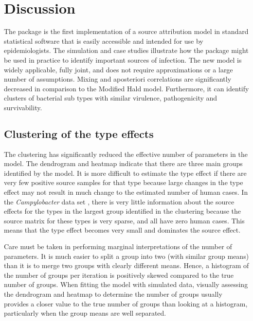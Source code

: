 \section{Discussion} \label{discussion_section}

The  package is the first implementation of a source attribution model in standard statistical software that is easily accessible and intended for use by epidemiologists. The simulation and case studies illustrate how the 
 package might be used in practice to identify important sources of infection. The new model is widely applicable, fully joint, and does not require approximations or a large number of 
assumptions. Mixing and aposteriori correlations are significantly decreased in comparison to the Modified Hald model. Furthermore, it can identify clusters of bacterial sub types with similar 
virulence, pathogenicity and survivability. 

\subsection{Clustering of the type effects}
The clustering has significantly reduced the effective number of parameters in the model. The dendrogram and heatmap indicate that there are three main groups identified by the model. It is more 
difficult to estimate the type effect if there are very few positive source samples for that type because large changes in the type effect may not result in much change to the estimated number of 
human cases. In the \emph{Campylobacter} data set \citep{MulJonNob09}, there is very little information about the source effects for the types in the largest group identified in the clustering because 
the source matrix for these types is very sparse, and all have zero human cases. This means that the type effect becomes very small and dominates the source effect.

Care must be taken in performing marginal interpretations of the number of parameters. It is much easier to split a group into two (with similar group means) than it is to merge two 
groups with clearly different means. Hence, a histogram of the number of groups per iteration is positively skewed compared to the true number of groups. When fitting the model with simulated data, 
visually assessing the dendrogram and heatmap to determine the number of groups usually provides a closer value to the true number of groups than looking at a histogram, particularly when the 
group means are well separated. 

